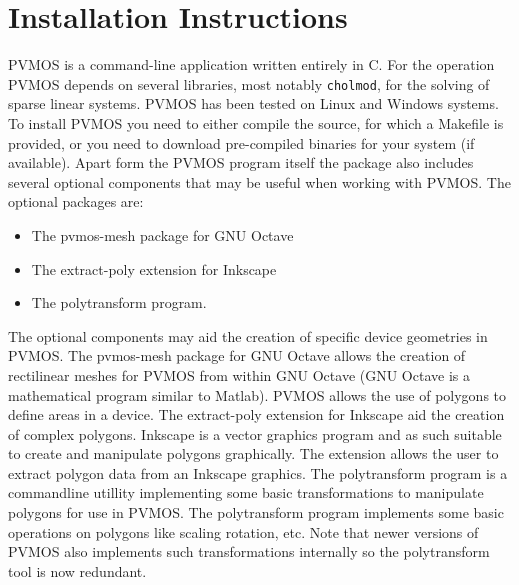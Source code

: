 \documentclass[noshowpacs,preprintnumbers,amsmath,amssymb, letter]{revtex4}
\begin{document}
\section{Installation Instructions}	
PVMOS is a command-line application written entirely in C. For the operation PVMOS depends on several libraries, most notably \texttt{cholmod}, for the solving of sparse linear systems. PVMOS has been tested on Linux and Windows systems. To install PVMOS you need to either compile the source, for which a Makefile is provided, or you need to download pre-compiled binaries for your system (if available). Apart form the PVMOS program itself the package also includes several optional components that may be useful when working with PVMOS. The optional packages are:
\begin{itemize}
\item{} The pvmos-mesh package for GNU Octave
\item{} The extract-poly extension for Inkscape
\item{} The polytransform program.
\end{itemize}

The optional components may aid the creation of specific device geometries in PVMOS. The pvmos-mesh package for GNU Octave allows the creation of rectilinear meshes for PVMOS from within GNU Octave (GNU Octave is a mathematical program similar to Matlab). PVMOS allows the use of polygons to define areas in a device. The extract-poly extension for Inkscape aid the creation of complex polygons. Inkscape is a vector graphics program and as such suitable to create and manipulate polygons graphically. The extension allows the user to extract polygon data from an Inkscape graphics. The polytransform program is a commandline utillity implementing some basic transformations to manipulate polygons for use in PVMOS. The polytransform program implements some basic operations on polygons like scaling rotation, etc. Note that newer versions of PVMOS also implements such transformations internally so the polytransform tool is now redundant.   
\end{document}
